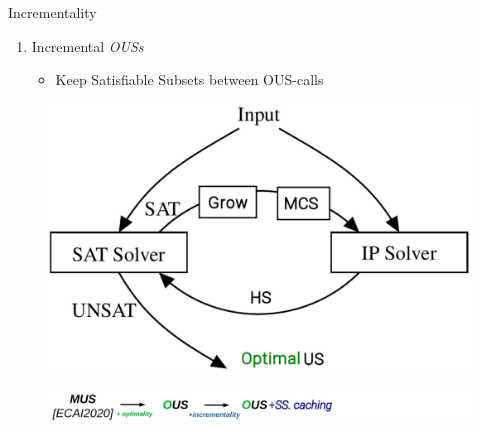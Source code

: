 \documentclass[handout]{beamer}
\begin{document}
		\begin{frame}{Incrementality}
		
		\begin{minipage}{0.59\textwidth}
			\begin{enumerate}
				\item {\color{vuborange} Incremental \emph{OUSs} }
				\begin{itemize}
					\item Keep Satisfiable Subsets between OUS-calls
				\end{itemize}	
			\end{enumerate}
		\end{minipage}
		\begin{minipage}{0.4\textwidth}
			\begin{figure}
				\includegraphics[width=\textwidth]{ihs.png}
			\end{figure}
		\end{minipage}
		\vfill
		\begin{figure}
			\includegraphics[width=\textwidth]{mus_to_ous_i.png}
		\end{figure}
	\end{frame}
	
	
	
\end{document}
